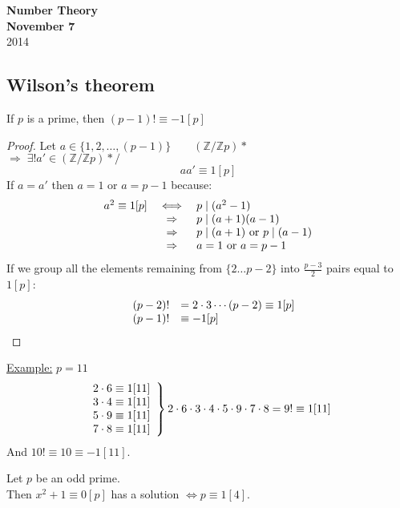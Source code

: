 \documentclass{report}
\begin{document}
{\centering
\Large
\textbf{Number Theory}\\
\normalsize
\textbf{November 7}\\
2014\\
}
\vspace{10mm}
\subsection*{Wilson's theorem}
If $p$ is a prime, then $(p-1)! \equiv -1[p]$
\begin{proof}
Let $a \in \{ 1,2,\dots,(p-1) \} \qquad  (\mathbb{Z}/\mathbb{Z}p)*$\\
$\Rightarrow \; \exists ! a' \in (\mathbb{Z}/\mathbb{Z}p)* /$
\[ aa' \equiv 1 [p] \]
If $a=a'$ then $a=1$ or $a=p-1$ because:
\[
\begin{array}{r c l}
a^2 \equiv 1[p] &\iff& p \mid (a^2-1)\\
&\Rightarrow& p \mid (a+1)(a-1)\\
&\Rightarrow& p \mid (a+1) \text{ or } p \mid (a-1)\\
&\Rightarrow& a=1 \text{ or } a=p-1 \\
\end{array}
\]
If we group all the elements remaining from $ \{ 2 \dots p-2 \} $ into $\frac{p-3}{2}$ pairs equal to $1[p]$:
\[
\begin{array}{r c l}
&(p-2)!&=2 \cdot 3 \cdots (p-2) \equiv 1[p]\\
&(p-1)!& \equiv -1[p]\\
\end{array}
\]
\end{proof}
\underline{Example:} $p=11$
\[
\left.
\begin{array}{r c l}
2 \cdot 6 \equiv 1[11]\\
3 \cdot 4 \equiv 1[11]\\
5 \cdot 9 \equiv 1[11]\\
7 \cdot 8 \equiv 1[11]\\
\end{array}
\right \}
2 \cdot 6 \cdot 3 \cdot 4 \cdot 5 \cdot 9 \cdot 7 \cdot 8 = 9! \equiv 1[11] \]
And $10! \equiv 10 \equiv -1[11]$.
\begin{thm} Let $p$ be an odd prime. \\Then $x^2+1 \equiv 0 [p]$ has a solution $\iff p \equiv 1[4]$.
\end{thm}
\end{document}
